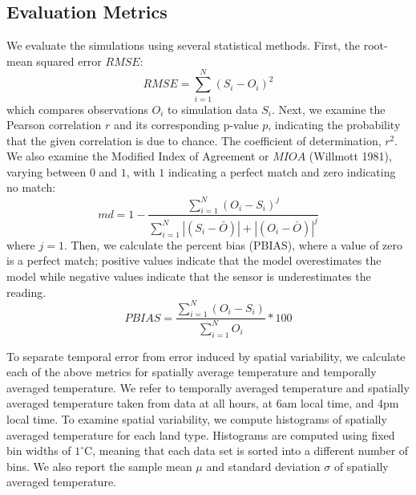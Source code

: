 \documentclass[draft,linenumbers]{agujournal}
\begin{document}
\subsection{Evaluation Metrics}
We evaluate the simulations using several statistical methods. 
First, the root-mean squared error $RMSE$:  
\begin{equation}%
RMSE = \sum_{i=1}^{N} \left(S_i - O_i\right)^2
\end{equation}
which compares observations $O_i$ to simulation data $S_i$.
Next, we examine the Pearson correlation $r$ and its corresponding p-value $p$, indicating the probability that the given correlation is due to chance. The coefficient of determination, $r^2$. We also examine the Modified Index of Agreement or $MIOA$ (Willmott 1981), varying between \(0\) and \(1\), with \(1\) indicating a perfect match and zero indicating no match: 
\begin{equation}
md = 1 - \frac{\sum_{i=1}^{N}(O_{i}-S_{i})^{j}}{\sum_{i=1}^{N}|(S_{i}-\bar{O})|+|(O_{i}-\bar{O})|^{j}}
\end{equation}
where $j=1$. 
Then, we calculate the percent bias (PBIAS), where a value of zero is a perfect match; positive values indicate that the model overestimates the model while negative values indicate that the sensor is underestimates the reading.
\begin{equation}
PBIAS = \frac{\sum_{i=1}^{N}(O_{i}-S_{i})}{\sum_{i=1}^{N}O_{i}}*100
\end{equation}

To separate temporal error from error induced by spatial variability, we calculate each of the above metrics for spatially average temperature and temporally averaged temperature. We refer to temporally averaged temperature  and spatially averaged temperature taken from data at all hours, at 6am local time, and 4pm local time. 
To examine spatial variability, we compute histograms of spatially averaged temperature for each land type. Histograms are computed using fixed bin widths of $1^\circ$C, meaning that each data set is sorted into a different number of bins. We also report the sample mean $\mu$ and standard deviation $\sigma$ of spatially averaged temperature. 
\end{document}
